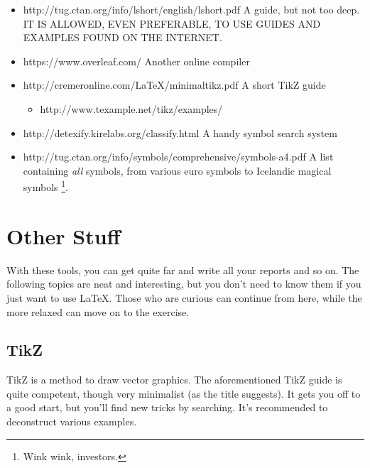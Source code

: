 \documentclass[12pt, titlepage, a4paper]{article}  %
\begin{document}
\begin{itemize}

\item http://tug.ctan.org/info/lshort/english/lshort.pdf
\subitem A guide, but not too deep. IT IS ALLOWED, EVEN PREFERABLE, TO USE GUIDES AND EXAMPLES FOUND ON THE INTERNET.
\item https://www.overleaf.com/
\subitem Another online compiler
\item http://cremeronline.com/LaTeX/minimaltikz.pdf
\subitem A short TikZ guide
    \begin{itemize}
    \item{http://www.texample.net/tikz/examples/}
    \end{itemize}
\item http://detexify.kirelabs.org/classify.html
\subitem A handy symbol search system
\item http://tug.ctan.org/info/symbols/comprehensive/symbols-a4.pdf
\subitem A list containing \emph{all} symbols, from various euro symbols to Icelandic magical symbols \footnote{Wink wink, investors.}.

\end{itemize}








\section{Other Stuff}

With these tools, you can get quite far and write all your reports and so on. The following topics are neat and interesting, but you don’t need to know them if you just want to use \LaTeX. Those who are curious can continue from here, while the more relaxed can move on to the exercise.

\subsection{TikZ}

TikZ is a method to draw vector graphics. The aforementioned TikZ guide is quite competent, though very minimalist (as the title suggests). It gets you off to a good start, but you’ll find new tricks by searching. It’s recommended to deconstruct various examples.
\end{document}
